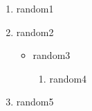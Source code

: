 

\begin{enumerate}
    \item random1
    \item random2
    \begin{itemize}
        \item random3
        \begin{enumerate}
            \item random4
        \end{enumerate}
    \end{itemize}
    \item random5
\end{enumerate}

